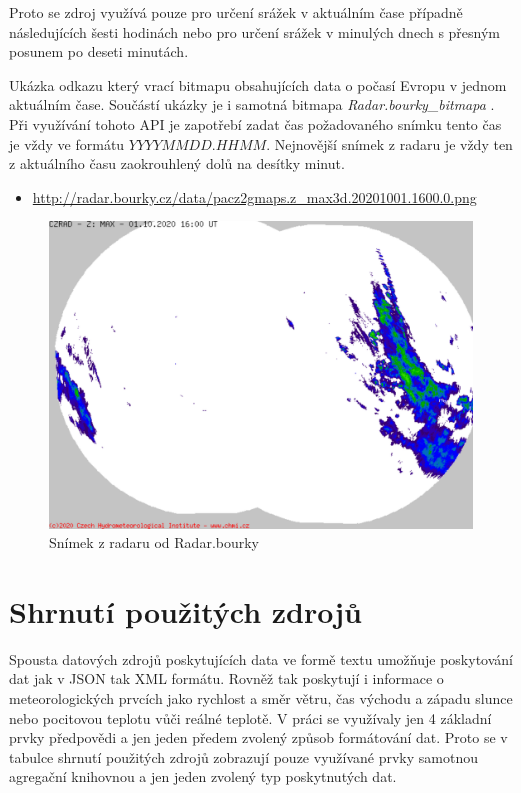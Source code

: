 \documentclass[czech,bachelor,dept460,male,csharp,cpdeclaration]{diploma}
\begin{document}
	Proto se zdroj využívá pouze pro určení srážek v aktuálním čase případně následujících šesti hodinách nebo pro určení srážek v minulých dnech s přesným posunem po deseti minutách.
	
	Ukázka odkazu který vrací bitmapu obsahujících data o počasí Evropu v jednom aktuálním čase. Součástí ukázky je i samotná bitmapa \emph{Radar.bourky\_bitmapa} \cite{chmi}. Při využívání tohoto API je zapotřebí zadat čas požadovaného snímku tento čas je vždy ve formátu $YYYYMMDD.HHMM$. Nejnovější snímek z radaru je vždy ten z aktuálního času zaokrouhlený dolů na desítky minut.
	
	\begin{itemize}
		\item \url{http://radar.bourky.cz/data/pacz2gmaps.z\_max3d.20201001.1600.0.png}
	\end{itemize}
	
	\begin{figure}
		\centering
		\includegraphics[scale=0.5]{Data/Rb_ukazka.png}
		\caption{Snímek z radaru od Radar.bourky \cite{chmi}}
	\end{figure}
	
	\section{Shrnutí použitých zdrojů}
	
	Spousta datových zdrojů poskytujících data ve formě textu umožňuje poskytování dat jak v JSON tak XML formátu. Rovněž tak poskytují i informace o meteorologických prvcích jako rychlost a směr větru, čas východu a západu slunce nebo pocitovou teplotu vůči reálné teplotě. V práci se využívaly jen 4 základní prvky předpovědi a jen jeden předem zvolený způsob formátování dat. Proto se v tabulce shrnutí použitých zdrojů zobrazují pouze využívané prvky samotnou agregační knihovnou a jen jeden zvolený typ poskytnutých dat.
	
\end{document}
